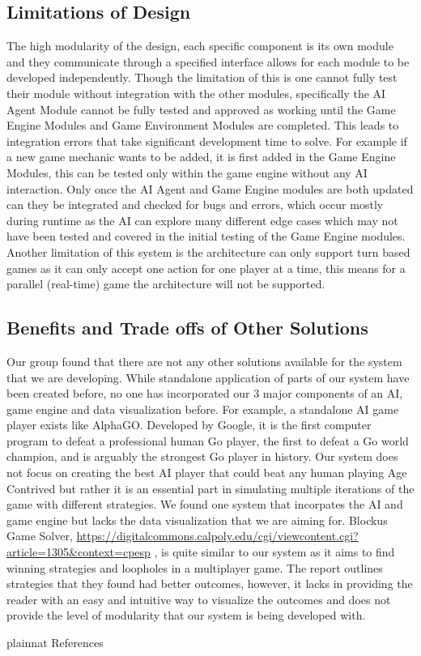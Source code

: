 \documentclass[12pt, titlepage]{article}
\begin{document}
\subsection{Limitations of Design}
The high modularity of the design, each specific component is its own module and they communicate through a specified interface allows for each module to be developed independently. Though the limitation of this is one cannot fully test their module without integration with the other modules, specifically the AI Agent Module cannot be fully tested and approved as working until the Game Engine Modules and Game Environment Modules are completed. This leads to integration errors that take significant development time to solve. For example if a new game mechanic wants to be added, it is first added in the Game Engine Modules, this can be tested only within the game engine without any AI interaction. Only once the AI Agent and Game Engine modules are both updated can they be integrated and checked for bugs and errors, which occur mostly during runtime as the AI can explore many different edge cases which may not have been tested and covered in the initial testing of the Game Engine modules. 
Another limitation of this system is the architecture can only support turn based games as it can only accept one action for one player at a time, this means for a parallel (real-time) game the architecture will not be supported.

\subsection{Benefits and Trade offs of Other Solutions}
Our group found that there are not any other solutions available for the system that we are developing. While standalone application of parts of our system have been created before, no one has incorporated our 3 major components of an AI, game engine and data visualization before. For example, a standalone AI game player exists like AlphaGO. Developed by Google, it is the first computer program to defeat a professional human Go player, the first to defeat a Go world champion, and is arguably the strongest Go player in history. Our system does not focus on creating the best AI player that could beat any human playing Age Contrived but rather it is an essential part in simulating multiple iterations of the game with different strategies. We found one system that incorpates the AI and game engine but lacks the data visualization that we are aiming for. Blockus Game Solver, \url{https://digitalcommons.calpoly.edu/cgi/viewcontent.cgi?article=1305&context=cpesp} \cite{chao}, is quite similar to our system as it aims to find winning strategies and loopholes in a multiplayer game. The report outlines strategies that they found had better outcomes, however, it lacks in providing the reader with an easy and intuitive way to visualize the outcomes and does not provide the level of modularity that our system is being developed with.  


 {plainnat}
 {References}
\end{document}
